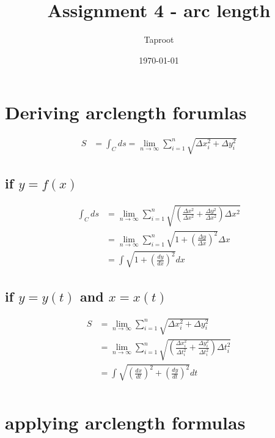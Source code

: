 \documentclass[letterpaper]{article}
\author{Taproot}
\date{\today}
\title{Assignment 4 - arc length}
\renewcommand\maketitle{}
\begin{document}
\maketitle
\setcounter{section}{5}
\section{Deriving arclength forumlas}
\label{sec:orgefe80bf}

\[\begin{aligned}
  S &=  \int_{C}^{}  ds = \lim_{n \to  \infty}  \sum_{i=1}^{n} \sqrt{\Delta x_i^2 + \Delta y_i^2} 
  \end{aligned}\]

\subsection{if \(y = f(x)\)}
\label{sec:orgdd914ac}

\[\begin{aligned}
    \int_{C}^{}  ds &= \lim_{n\to \infty}  \sum_{i=1}^{n} \sqrt{\left(\frac{\Delta x^2}{\Delta x^2} + \frac{\Delta y^2}{\Delta x^2}\right)\Delta x^2}\\
    &= \lim_{n\to \infty}  \sum_{i=1}^{n} \sqrt{1 + \left(\frac{\Delta y}{\Delta x}\right)^2} \Delta x\\
    &= \int \sqrt{1 + \left(\frac{dy}{dx}\right)^2} dx 
   \end{aligned}\]


\subsection{if \(y = y(t)\) and \(x = x(t)\)}
\label{sec:orgcc35597}



\[\begin{aligned}
  S &= \lim_{n \to  \infty}  \sum_{i=1}^{n} \sqrt{\Delta x_i^2 + \Delta y_i^2} \\
  &= \lim_{n \to  \infty}  \sum_{i=1}^{n} \sqrt{\left(\frac{\Delta x_i^2}{\Delta t_i^2} + \frac{\Delta y_i^2}{\Delta t_i^2}\right)\Delta t_i^2} \\
  &= \int \sqrt{\left(\frac{dx}{dt}\right)^2 + \left(\frac{dy}{dt}\right)^2} dt \\
   \end{aligned}\]

\section{applying arclength formulas}
\label{sec:org8064bd3}
\end{document}
